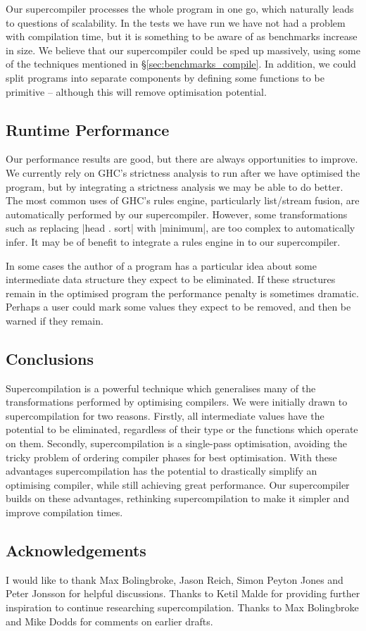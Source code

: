 \documentclass[draft]{sigplanconf}
\begin{document}
Our supercompiler processes the whole program in one go, which naturally leads to questions of scalability. In the tests we have run we have not had a problem with compilation time, but it is something to be aware of as benchmarks increase in size. We believe that our supercompiler could be sped up massively, using some of the techniques mentioned in \S\ref{sec:benchmarks_compile}. In addition, we could split programs into separate components by defining some functions to be primitive -- although this will remove optimisation potential.

\subsection{Runtime Performance}

Our performance results are good, but there are always opportunities to improve. We currently rely on GHC's strictness analysis to run after we have optimised the program, but by integrating a strictness analysis we may be able to do better. The most common uses of GHC's rules engine, particularly list/stream fusion, are automatically performed by our supercompiler. However, some transformations such as replacing |head . sort| with |minimum|, are too complex to automatically infer. It may be of benefit to integrate a rules engine in to our supercompiler.

In some cases the author of a program has a particular idea about some intermediate data structure they expect to be eliminated. If these structures remain in the optimised program the performance penalty is sometimes dramatic. Perhaps a user could mark some values they expect to be removed, and then be warned if they remain.

\subsection{Conclusions}

Supercompilation is a powerful technique which generalises many of the transformations performed by optimising compilers. We were initially drawn to supercompilation for two reasons. Firstly, all intermediate values have the potential to be eliminated, regardless of their type or the functions which operate on them. Secondly, supercompilation is a single-pass optimisation, avoiding the tricky problem of ordering compiler phases for best optimisation. With these advantages supercompilation has the potential to drastically simplify an optimising compiler, while still achieving great performance. Our supercompiler builds on these advantages, rethinking supercompilation to make it simpler and improve compilation times.

\subsection*{Acknowledgements}

I would like to thank Max Bolingbroke, Jason Reich, Simon Peyton Jones and Peter Jonsson for helpful discussions. Thanks to Ketil Malde for providing further inspiration to continue researching supercompilation. Thanks to Max Bolingbroke and Mike Dodds for comments on earlier drafts.


\balance

\end{document}
